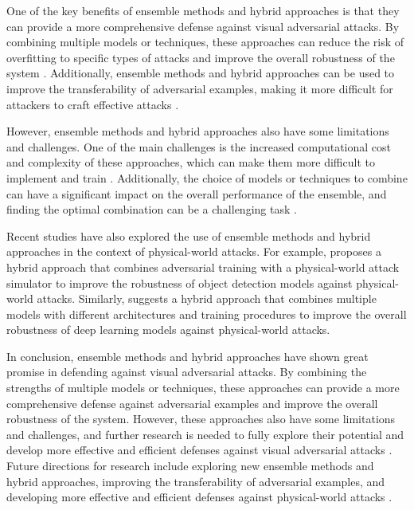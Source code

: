 \documentclass[11pt,a4paper]{article}
\begin{document}
One of the key benefits of ensemble methods and hybrid approaches is that they can provide a more comprehensive defense against visual adversarial attacks. By combining multiple models or techniques, these approaches can reduce the risk of overfitting to specific types of attacks and improve the overall robustness of the system \cite{doi:10.1201/9781351251389-8}. Additionally, ensemble methods and hybrid approaches can be used to improve the transferability of adversarial examples, making it more difficult for attackers to craft effective attacks \cite{arxiv:1904.02884}.

However, ensemble methods and hybrid approaches also have some limitations and challenges. One of the main challenges is the increased computational cost and complexity of these approaches, which can make them more difficult to implement and train \cite{doi:10.1007/978-3-030-01258-8_39}. Additionally, the choice of models or techniques to combine can have a significant impact on the overall performance of the ensemble, and finding the optimal combination can be a challenging task \cite{arxiv:1904.13000}.

Recent studies have also explored the use of ensemble methods and hybrid approaches in the context of physical-world attacks. For example, \cite{doi:10.1007/978-3-030-58589-1_3} proposes a hybrid approach that combines adversarial training with a physical-world attack simulator to improve the robustness of object detection models against physical-world attacks. Similarly, \cite{arxiv:1707.08945} suggests a hybrid approach that combines multiple models with different architectures and training procedures to improve the overall robustness of deep learning models against physical-world attacks.

In conclusion, ensemble methods and hybrid approaches have shown great promise in defending against visual adversarial attacks. By combining the strengths of multiple models or techniques, these approaches can provide a more comprehensive defense against adversarial examples and improve the overall robustness of the system. However, these approaches also have some limitations and challenges, and further research is needed to fully explore their potential and develop more effective and efficient defenses against visual adversarial attacks \cite{arxiv:1911.05268}. Future directions for research include exploring new ensemble methods and hybrid approaches, improving the transferability of adversarial examples, and developing more effective and efficient defenses against physical-world attacks \cite{arxiv:2209.14262}.
\end{document}
